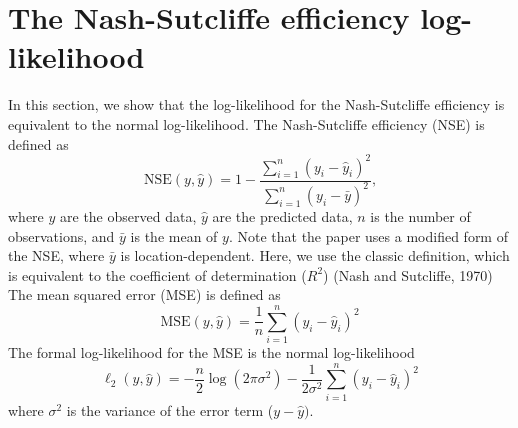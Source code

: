 \documentclass{article}
\begin{document}
\section{The Nash-Sutcliffe efficiency log-likelihood} %

In this section, we show that the log-likelihood for the Nash-Sutcliffe efficiency
is equivalent to the normal log-likelihood.
The Nash-Sutcliffe efficiency (NSE) is defined as
\begin{equation}
  \text{NSE}(y, \hat{y}) = 1 - \frac{\sum_{i=1}^n (y_i - \hat{y}_i)^2}{\sum_{i=1}^n (y_i - \bar{y})^2} \text{,}
  \label{eq:app-nse}
\end{equation}
where 
$y$ are the observed data,
$\hat{y}$ are the predicted data,
$n$ is the number of observations,
and $\bar{y}$ is the mean of $y$.
Note that the paper uses a modified form of the NSE, where $\bar{y}$ is location-dependent.
Here, we use the classic definition, which is equivalent to the coefficient of determination ($R^2$) (Nash and Sutcliffe, 1970) %
The mean squared error (MSE) is defined as
\begin{equation}
  \text{MSE}(y, \hat{y}) = \frac{1}{n} \sum_{i=1}^n (y_i - \hat{y}_i)^2
  \label{eq:app-mse}
\end{equation}
The formal log-likelihood for the MSE is the normal log-likelihood
\begin{equation}
  \ell_2(y, \hat{y}) = -\frac{n}{2} \log(2 \pi \sigma^2) - \frac{1}{2 \sigma^2} \sum_{i=1}^n (y_i - \hat{y}_i)^2
  \label{eq:app-l2}
\end{equation}
where $\sigma^2$ is the variance of the error term ($y - \hat{y})$.
\end{document}
